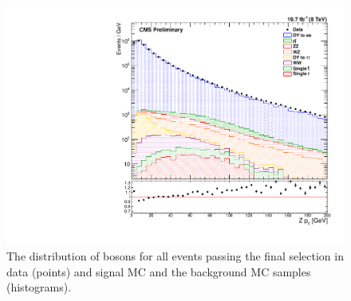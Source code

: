 \begin{figure}[p]
    \centering
    \includegraphics[width=\textwidth]{figures/z_pt_powheg.pdf}
    \caption[
        The \bosonpt distribution of \Z bosons in data and MC with \PPsixZtwo
        signal MC.
    ]{
        The \bosonpt distribution of \Z bosons for all events passing the final
        selection in data (points) and \PPsixZtwo signal MC and the background
        MC samples (histograms).
    }
    \label{fig:z_pt_powheg}
\end{figure}
